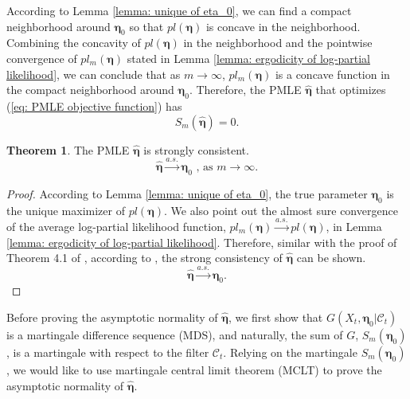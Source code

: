 \documentclass{article}
\theoremstyle{definition}
\newtheorem{theorem}{Theorem}[section]
\begin{document}
According to Lemma \ref{lemma: unique of eta_0}, we can find a compact neighborhood around $\bm{\eta}_0$ so that $pl(\bm{\eta})$ is concave in the neighborhood. Combining the concavity of $pl(\bm{\eta})$ in the neighborhood and the pointwise convergence of $pl_m(\bm{\eta})$ stated in Lemma \ref{lemma: ergodicity of log-partial likelihood}, we can conclude that as $m\rightarrow \infty$, $pl_m(\bm{\eta})$ is a concave function in the compact neighborhood around $\bm{\eta}_0$. Therefore, the PMLE $\hat{\bm{\eta}}$ that optimizes (\ref{eq: PMLE objective function}) has
\begin{equation}
\label{eq: Sm=0}
    S_m(\hat{\bm{\eta}}) = 0.
\end{equation}

\begin{theorem}
\label{theorem: consistency}
The PMLE $\hat{\bm{\eta}}$ is strongly consistent.
\begin{equation*}
    \hat{\bm{\eta}} \overset{a.s.}{\rightarrow}\bm{\eta}_0 \text{ , as } m \rightarrow \infty.
\end{equation*}
\end{theorem}
\begin{proof}
According to Lemma \ref{lemma: unique of eta_0}, the true parameter $\bm{\eta}_0$ is the unique maximizer of $pl(\bm{\eta})$. We also point out the almost sure convergence of the average log-partial likelihood function, $pl_m(\bm{\eta}) \overset{a.s.}{\rightarrow} pl(\bm{\eta})$, in Lemma \ref{lemma: ergodicity of log-partial likelihood}. Therefore, similar with the proof of Theorem 4.1 of \cite{straumann2006quasi}, according to \cite{wald1949note}, the strong consistency of $\hat{\bm{\eta}}$ can be shown.
\begin{equation*}
    \hat{\bm{\eta}} \overset{a.s.}{\rightarrow}\bm{\eta}_0.
\end{equation*}
\end{proof}

Before proving the asymptotic normality of $\hat{\bm{\eta}}$, we first show that $G(X_t,\bm{\eta}_0|\mathcal{C}_t)$ is a martingale difference sequence (MDS), and naturally, the sum of $G$, $S_m(\bm{\eta}_0)$, is a martingale with respect to the filter $\mathcal{C}_t$. Relying on the martingale $S_m(\bm{\eta}_0)$, we would like to use martingale central limit theorem (MCLT) to prove the asymptotic normality of $\hat{\bm{\eta}}$.
\end{document}
